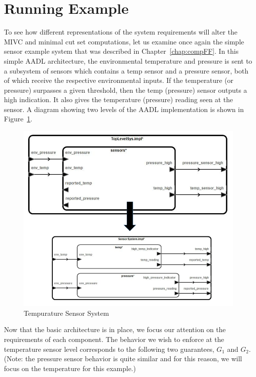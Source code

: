 \section{Running Example}
\label{sec:granularityEx}
To see how different representations of the system requirements will alter the MIVC and minimal cut set computations, let us examine once again the simple sensor example system that was described in Chapter~\ref{chap:compFF}. In this simple AADL architecture, the environmental temperature and pressure is sent to a subsystem of sensors which contains a temp sensor and a pressure sensor, both of which receive the respective environmental inputs. If the temperature (or pressure) surpasses a given threshold, then the temp (pressure) sensor outputs a high indication. It also gives the temperature (pressure) reading seen at the sensor. A diagram showing two levels of the AADL implementation is shown in Figure~\ref{fig:sensorGran1}.  

\begin{figure}[h]
\begin{center}
\includegraphics[width=14cm]{images/sensorGran.png}
\caption{Tempurature Sensor System} 
\label{fig:sensorGran1}
\end{center}
\end{figure}

Now that the basic architecture is in place, we focus our attention on the requirements of each component. The behavior we wish to enforce at the temperature sensor level corresponds to the following two guarantees, $G_1$ and $G_2$. (Note: the pressure sensor behavior is quite similar and for this reason, we will focus on the temperature for this example.) 


